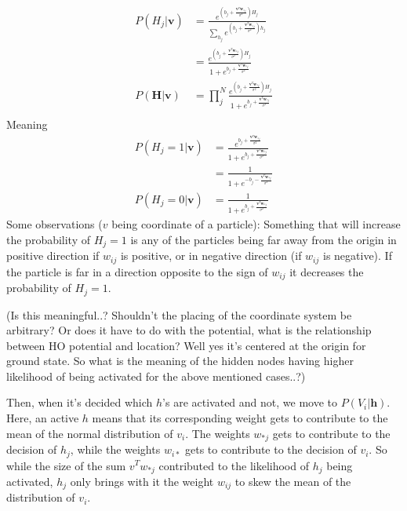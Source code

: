 \documentclass[norsk,a4paper,11pt]{article}
\begin{document}
\begin{align}
	P(H_j|\mathbf{v}) &= \frac{e^{(b_j+\frac{\mathbf{v}^T\mathbf{w}_{*j}}{\sigma^2})H_j}}{\sum_{h_j}e^{(b_j+\frac{\mathbf{v}^T\mathbf{w}_{*j}}{\sigma^2})h_j}} \\
	&= \frac{e^{(b_j+\frac{\mathbf{v}^T\mathbf{w}_{*j}}{\sigma^2})H_j}}{1+e^{b_j+\frac{\mathbf{v}^T\mathbf{w}_{*j}}{\sigma^2}}} \\
	P(\mathbf{H}|\mathbf{v}) &= \prod_j^N \frac{e^{(b_j+\frac{\mathbf{v}^T\mathbf{w}_{*j}}{\sigma^2})H_j}}{1+e^{b_j+\frac{\mathbf{v}^T\mathbf{w}_{*j}}{\sigma^2}}} \\
\end{align}
Meaning
\begin{align}
	P(H_j=1|\mathbf{v}) &= \frac{e^{b_j+\frac{\mathbf{v}^T\mathbf{w}_{*j}}{\sigma^2}}}{1+e^{b_j+\frac{\mathbf{v}^T\mathbf{w}_{*j}}{\sigma^2}}} \\
	&= \frac{1}{1+e^{-b_j-\frac{\mathbf{v}^T\mathbf{w}_{*j}}{\sigma^2}}} \\
	P(H_j=0|\mathbf{v}) &= \frac{1}{1+e^{b_j+\frac{\mathbf{v}^T\mathbf{w}_{*j}}{\sigma^2}}} 
\end{align}
Some observations ($v$ being coordinate of a particle): \linebreak
Something that will increase the probability of $H_j=1$ is any of the particles being far away from the origin in positive direction if $w_{ij}$ is positive, or in negative direction (if $w_{ij}$ is negative). If the particle is far in a direction opposite to the sign of $w_{ij}$ it decreases the probability of $H_j=1$.


(Is this meaningful..? Shouldn't the placing of the coordinate system be arbitrary? Or does it have to do with the potential, what is the relationship between HO potential and location? Well yes it's centered at the origin for ground state. So what is the meaning of the hidden nodes having higher likelihood of being activated for the above mentioned cases..?)

Then, when it's decided which $h$'s are activated and not, we move to $P(V_i|\mathbf{h})$. Here, an active $h$ means that its corresponding weight gets to contribute to the mean of the normal distribution of $v_i$. The weights $w_{*j}$ gets to contribute to the decision of $h_j$, while the weights $w_{i*}$ gets to contribute to the decision of $v_i$. So while the size of the sum $v^T w_{*j}$ contributed to the likelihood of $h_j$ being activated, $h_j$ only brings with it the weight $w_{ij}$ to skew the mean of the distribution of $v_i$.
\end{document}
